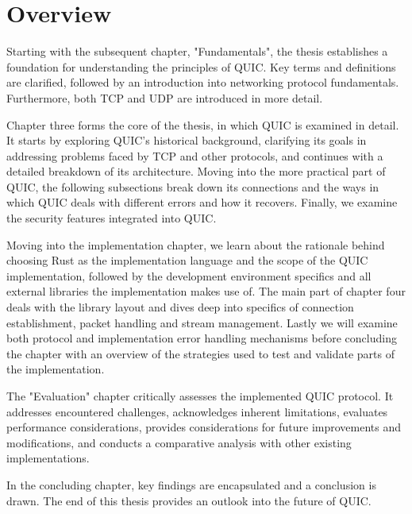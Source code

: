 \section{Overview}

Starting with the subsequent chapter, "Fundamentals", the thesis establishes a foundation for understanding
the principles of QUIC. Key terms and definitions are clarified, followed by an introduction into networking
protocol fundamentals. Furthermore, both TCP and UDP are introduced in more detail.

Chapter three forms the core of the thesis, in which QUIC is examined in detail. It starts by exploring QUIC's
historical background, clarifying its goals in addressing problems faced by TCP and other protocols, and continues
with a detailed breakdown of its architecture. Moving into the more practical part of QUIC, the following
subsections break down its connections and the ways in which QUIC deals with different errors and how it recovers.
Finally, we examine the security features integrated into QUIC.

Moving into the implementation chapter, we learn about the rationale behind choosing Rust as the implementation
language and the scope of the QUIC implementation, followed by the development environment specifics and all
external libraries the implementation makes use of. The main part of chapter four deals with the library layout
and dives deep into specifics of connection establishment, packet handling and stream management. Lastly we will
examine both protocol and implementation error handling mechanisms before concluding the chapter with an overview
of the strategies used to test and validate parts of the implementation.

The "Evaluation" chapter critically assesses the implemented QUIC protocol. It addresses encountered challenges,
acknowledges inherent limitations, evaluates performance considerations, provides considerations for future
improvements and modifications, and conducts a comparative analysis with other existing implementations.

In the concluding chapter, key findings are encapsulated and a conclusion is drawn. The end of this thesis provides
an outlook into the future of QUIC.